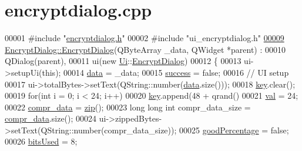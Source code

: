 \hypertarget{encryptdialog_8cpp_source}{}\section{encryptdialog.\+cpp}
\label{encryptdialog_8cpp_source}

\begin{DoxyCode}
00001 \textcolor{preprocessor}{#include "\mbox{\hyperlink{encryptdialog_8h}{encryptdialog.h}}"}
00002 \textcolor{preprocessor}{#include "ui\_encryptdialog.h"}
\mbox{\hyperlink{class_encrypt_dialog_ab57e8b3a0d00c977e81f3b356657524e}{00009}} \mbox{\hyperlink{class_encrypt_dialog_ab57e8b3a0d00c977e81f3b356657524e}{EncryptDialog::EncryptDialog}}(QByteArray \_data, QWidget *parent) :
00010     QDialog(parent),
00011     ui(new \mbox{\hyperlink{namespace_ui}{Ui}}::\mbox{\hyperlink{class_encrypt_dialog}{EncryptDialog}})
00012 \{
00013     ui->setupUi(\textcolor{keyword}{this});
00014     \mbox{\hyperlink{class_encrypt_dialog_acf3a8bbce90d99ef17fec093c35b1008}{data}} = \_data;
00015     \mbox{\hyperlink{class_encrypt_dialog_ada4900bcd40894d9c098c65aa4066ac9}{success}} = \textcolor{keyword}{false};
00016     \textcolor{comment}{// UI setup}
00017     ui->totalBytes->setText(QString::number(\mbox{\hyperlink{class_encrypt_dialog_acf3a8bbce90d99ef17fec093c35b1008}{data}}.size()));
00018     \mbox{\hyperlink{class_encrypt_dialog_a1afdef3c665fb0d0fae06d1df8e84951}{key}}.clear();
00019     \textcolor{keywordflow}{for}(\textcolor{keywordtype}{int} i = 0; i < 24; i++)
00020         \mbox{\hyperlink{class_encrypt_dialog_a1afdef3c665fb0d0fae06d1df8e84951}{key}}.append(48 + qrand() %
00021     \mbox{\hyperlink{class_encrypt_dialog_a3c9da51b5e9d98d702bcc4ed15405fd5}{val}} = 24;
00022     \mbox{\hyperlink{class_encrypt_dialog_a3e8998aa39696cbd1242f6420ef18143}{compr\_data}} = \mbox{\hyperlink{class_encrypt_dialog_a2bff820a3df4ddc36ecb07ed74b7138a}{zip}}();
00023     \textcolor{keywordtype}{long} \textcolor{keywordtype}{long} \textcolor{keywordtype}{int} compr\_data\_size = \mbox{\hyperlink{class_encrypt_dialog_a3e8998aa39696cbd1242f6420ef18143}{compr\_data}}.size();
00024     ui->zippedBytes->setText(QString::number(compr\_data\_size));
00025     \mbox{\hyperlink{class_encrypt_dialog_a0c821b893cfddd7a6c07bbd270ba49e9}{goodPercentage}} = \textcolor{keyword}{false};
00026     \mbox{\hyperlink{class_encrypt_dialog_abf638fea37fbdbaba215954e2e239860}{bitsUsed}} = 8;

\end{DoxyCode}

